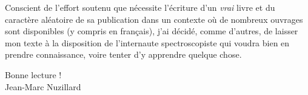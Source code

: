 Conscient de l'effort soutenu que nécessite l'écriture d'un \emph{vrai}
livre et du caractère aléatoire de sa publication
dans un contexte où de nombreux ouvrages sont disponibles (y compris en français),
j'ai décidé, comme d'autres, de laisser mon texte
à la disposition de l'internaute spectroscopiste qui voudra bien en prendre
connaissance, voire tenter d'y apprendre quelque chose.

Bonne lecture !\\[1ex]

Jean-Marc Nuzillard
